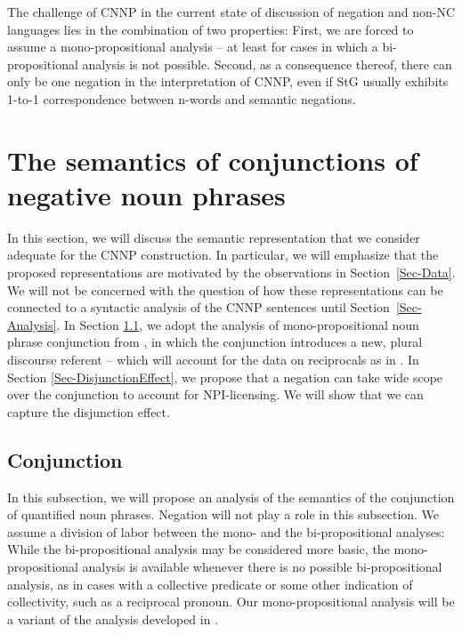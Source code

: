 \documentclass[output=paper]{langsci/langscibook}
\begin{document}

\bigskip%
\begin{sloppypar}
  The challenge of CNNP in the current state of discussion of negation
  and non-NC languages lies in the combination of two properties:
  First, we are forced to assume a mono-propositional analysis -- at
  least for cases in which a bi-propositional analysis is not
  possible. Second, as a consequence thereof, there can only be one
  negation in the interpretation of CNNP, even if StG usually exhibits
  1-to-1 correspondence between n-words and semantic negations.
\end{sloppypar}



\section{The semantics of conjunctions of negative noun phrases}
\label{Sec-Semantics}

In this section, 
we will discuss the semantic representation that we consider adequate for the CNNP construction. 
In particular, we will emphasize that the proposed representations are motivated by the observations in Section~\ref{Sec-Data}.
We will not be concerned with the question of how these representations can be connected to a syntactic analysis of the CNNP sentences until Section~\ref{Sec-Analysis}.
%
In Section \ref{Sec-Conjunction},
we adopt the analysis of mono-propositional noun phrase conjunction from \citet{Chaves:07}, in which 
 the conjunction introduces a new, plural discourse referent -- which will account for the data on reciprocals as in .
In Section \ref{Sec-DisjunctionEffect}, we propose that a negation can take wide scope over the conjunction to account for NPI-licensing. 
We will show that we can capture the disjunction effect.  %

\subsection{Conjunction}
\label{Sec-Conjunction}

In this subsection, we will propose an analysis of the semantics of the conjunction of quantified noun phrases.
Negation will not play a role in this subsection.
We assume a division of labor between the mono- and the bi-propositional analyses: 
While the bi-propositional analysis may be considered more basic, the mono-propositional analysis is available whenever there is no possible bi-propositional analysis,
as in 
cases with a collective predicate or some other indication of collectivity, such as a reciprocal pronoun. 
Our mono-propositional analysis will be a variant of the analysis developed in \citet{Chaves:07}. 
\end{document}

